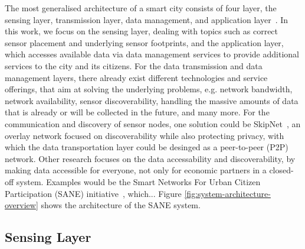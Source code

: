  The most generalised architecture of a smart city consists of four layer, the sensing layer, transmission layer, data management, and application layer~\cite{silva2018towards}. In this work, we focus on the sensing layer, dealing with topics such as correct sensor placement and underlying sensor footprints, and the application layer, which accesses available data via data management services to provide additional services to the city and its citizens. For the data transmission and data management layers, there already exist different technologies and service offerings, that aim at solving the underlying problems, e.g. network bandwidth, network availability, sensor discoverability, handling the massive amounts of data that is already or will be collected in the future, and many more. For the communication and discovery of sensor nodes, one solution could be SkipNet~\cite{harvey2002skipnet}, an overlay network focused on discoverability while also protecting privacy, with which the data transportation layer could be desinged as a peer-to-peer (P2P) network. Other research focuses on the data accessability and discoverability, by making data accessible for everyone, not only for economic partners in a closed-off system. Examples would be the Smart Networks For Urban Citizen Participation (SANE) initiative~\cite{bornholdt2019sane}, which... Figure \ref{fig:system-architecture-overview} shows the architecture of the SANE system.


\subsection{Sensing Layer}
\label{subsec: Sensing Layer}


